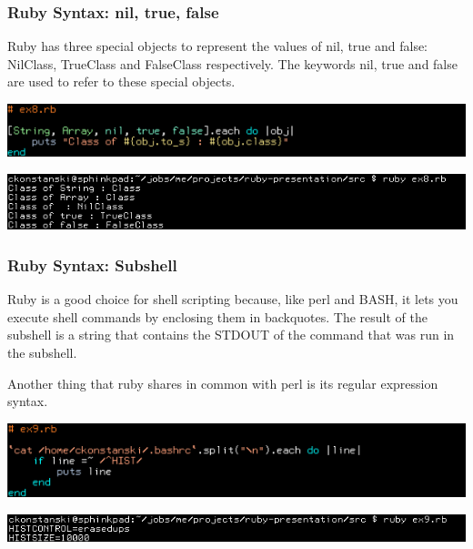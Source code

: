 \documentclass[helvetica,english,utf8,notitle,nologo]{beamer}
\begin{document}
\begin{frame}
  \frametitle{Ruby Syntax: nil, true, false}

  Ruby has three special objects to represent the values of nil, true
  and false: NilClass, TrueClass and FalseClass respectively. The
  keywords nil, true and false are used to refer to these special
  objects.

  \includegraphics[scale=0.53]{src_8}

  \includegraphics[scale=0.5]{out_8}
\end{frame}

\begin{frame}
  \frametitle{Ruby Syntax: Subshell}

  Ruby is a good choice for shell scripting because, like perl and
  BASH, it lets you execute shell commands by enclosing them in
  backquotes. The result of the subshell is a string that contains the
  STDOUT of the command that was run in the subshell.

  Another thing that ruby shares in common with perl is its regular
  expression syntax.
  
  \includegraphics[scale=0.53]{src_9}

  \includegraphics[scale=0.5]{out_9}
\end{frame}
\end{document}
